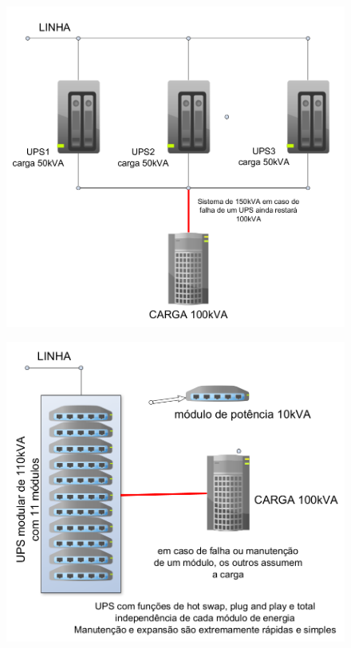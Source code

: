 \begin{enumerate}
\begin{figure}[H]
\begin{minipage}{0.45\textwidth}
			\label{fig: redundancia2}
		\end{minipage}
	\end{figure}
	\begin{figure}[H]
	\centering
		\begin{minipage}{0.45\textwidth}
			\centering
			\includegraphics[width=\textwidth]{Figures/7. nobreak/redundancia3.png}
			\label{fig: redundancia3}
		\end{minipage}
		\begin{minipage}{0.45\textwidth}
			\centering
			\includegraphics[width=\textwidth]{Figures/7. nobreak/redundancia4.png}
			\label{fig: redundancia4}
		\end{minipage}
	\end{figure}

\end{enumerate}